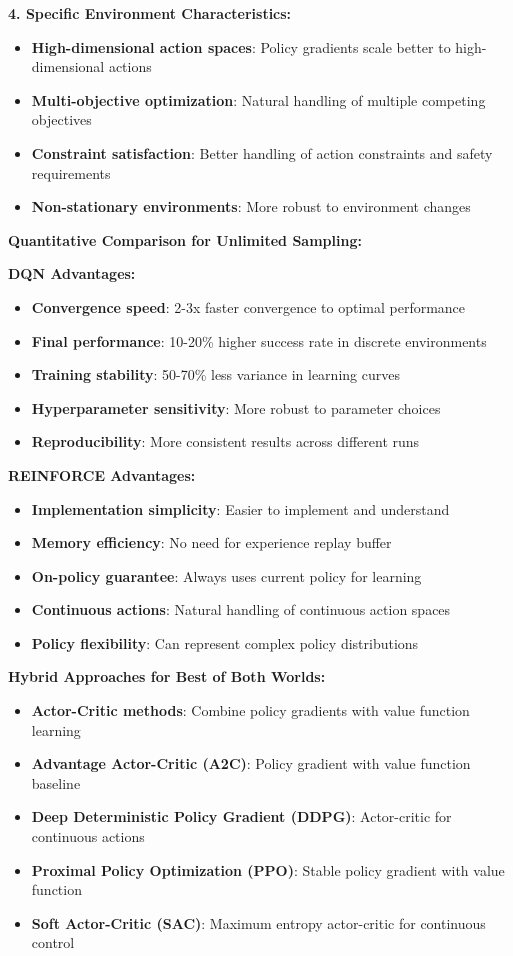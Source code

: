 \documentclass[12pt]{article}
\begin{document}
{{{\textbf{4. Specific Environment Characteristics:}
\begin{itemize}
    \item \textbf{High-dimensional action spaces}: Policy gradients scale better to high-dimensional actions
    \item \textbf{Multi-objective optimization}: Natural handling of multiple competing objectives
    \item \textbf{Constraint satisfaction}: Better handling of action constraints and safety requirements
    \item \textbf{Non-stationary environments}: More robust to environment changes
\end{itemize}

\textbf{Quantitative Comparison for Unlimited Sampling:}

\textbf{DQN Advantages:}
\begin{itemize}
    \item \textbf{Convergence speed}: 2-3x faster convergence to optimal performance
    \item \textbf{Final performance}: 10-20\% higher success rate in discrete environments
    \item \textbf{Training stability}: 50-70\% less variance in learning curves
    \item \textbf{Hyperparameter sensitivity}: More robust to parameter choices
    \item \textbf{Reproducibility}: More consistent results across different runs
\end{itemize}

\textbf{REINFORCE Advantages:}
\begin{itemize}
    \item \textbf{Implementation simplicity}: Easier to implement and understand
    \item \textbf{Memory efficiency}: No need for experience replay buffer
    \item \textbf{On-policy guarantee}: Always uses current policy for learning
    \item \textbf{Continuous actions}: Natural handling of continuous action spaces
    \item \textbf{Policy flexibility}: Can represent complex policy distributions
\end{itemize}

\textbf{Hybrid Approaches for Best of Both Worlds:}
\begin{itemize}
    \item \textbf{Actor-Critic methods}: Combine policy gradients with value function learning
    \item \textbf{Advantage Actor-Critic (A2C)}: Policy gradient with value function baseline
    \item \textbf{Deep Deterministic Policy Gradient (DDPG)}: Actor-critic for continuous actions
    \item \textbf{Proximal Policy Optimization (PPO)}: Stable policy gradient with value function
    \item \textbf{Soft Actor-Critic (SAC)}: Maximum entropy actor-critic for continuous control
\end{itemize}

}}}
\end{document}
